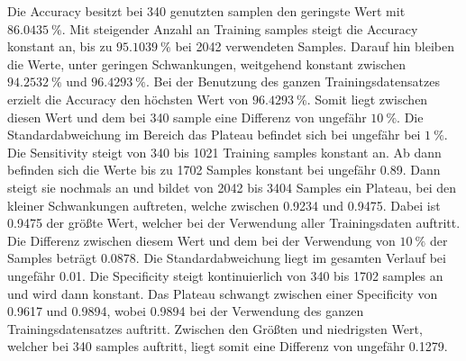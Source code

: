 Die Accuracy besitzt bei 340 genutzten samplen den geringste Wert mit $\qty{86.0435}{\%}$.
Mit steigender Anzahl an Training samples steigt die Accuracy konstant an, bis zu $\qty{95.1039}{\%}$ bei 2042 verwendeten Samples. 
Darauf hin bleiben die Werte, unter geringen Schwankungen, weitgehend konstant zwischen $\qty{94.2532}{\%}$ und $\qty{96.4293}{\%}$. 
Bei der Benutzung des ganzen Trainingsdatensatzes erzielt die Accuracy den höchsten Wert von $\qty{96.4293}{\%}$.
Somit liegt zwischen diesen Wert und dem bei 340 sample eine Differenz von ungefähr $\qty{10}{\%}$. 
Die Standardabweichung im Bereich das Plateau befindet sich bei ungefähr bei $\qty{1}{\%}$.
Die Sensitivity steigt von 340 bis 1021 Training samples konstant an. 
Ab dann befinden sich die Werte bis zu 1702 Samples konstant bei ungefähr 0.89. 
Dann steigt sie nochmals an und bildet von 2042 bis 3404 Samples ein Plateau, bei den kleiner Schwankungen auftreten, 
welche zwischen 0.9234 und 0.9475.
Dabei ist 0.9475 der größte Wert, welcher bei der Verwendung aller Trainingsdaten auftritt. 
Die Differenz zwischen diesem Wert und dem bei der Verwendung von $\qty{10}{\%}$ der Samples beträgt 0.0878. 
Die Standardabweichung liegt im gesamten Verlauf bei ungefähr 0.01.
Die Specificity steigt kontinuierlich von 340 bis 1702 samples an und wird dann konstant.
Das Plateau schwangt zwischen einer Specificity von 0.9617 und 0.9894, wobei 0.9894 bei der Verwendung des ganzen Trainingsdatensatzes auftritt.
Zwischen den Größten und niedrigsten Wert, welcher bei 340 samples auftritt, liegt somit eine Differenz von ungefähr 0.1279.

